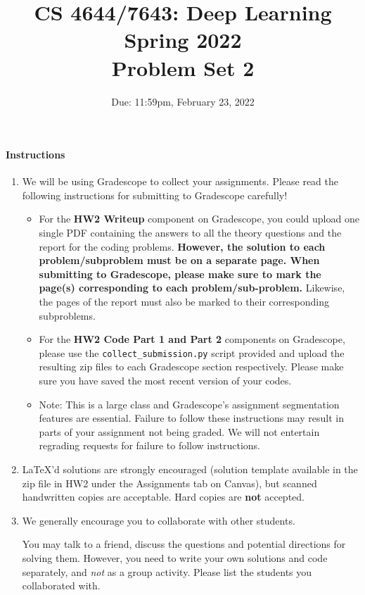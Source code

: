 \documentclass[11pt,english]{article}
\begin{document}
\title{CS 4644/7643: Deep Learning\\
Spring 2022 \\
Problem Set 2}


\date{Due: 11:59pm, February 23, 2022}
\maketitle


\paragraph*{Instructions}
\begin{enumerate}
\item We will be using Gradescope to collect your assignments.  Please read the following instructions for submitting to Gradescope carefully!
     \begin{itemize}
          \item
               For the \textbf{HW2 Writeup} component on Gradescope, you could upload one single PDF containing the answers to all the theory questions and the report for the coding problems. \textbf{However, the solution to each problem/subproblem must be on a separate page. When submitting to Gradescope, please make sure to mark the page(s) corresponding to each problem/sub-problem.} Likewise, the pages of the report must also be marked to their corresponding subproblems.
          \item
               For the \textbf{HW2 Code Part 1 and Part 2} components on Gradescope, 
               please use the \texttt{collect\_submission.py} script provided and upload the resulting zip files to each Gradescope section respectively. Please make sure you have saved the most recent version of your codes.
          \item
               Note: This is a large class and Gradescope's assignment segmentation features are essential.
               Failure to follow these instructions may result in parts of your assignment not being graded.
               We will not entertain regrading requests for failure to follow instructions.
     \end{itemize}

\item
     \LaTeX'd solutions are strongly encouraged (solution template available in the zip file in HW2 under the Assignments tab on Canvas),
     but scanned handwritten copies are acceptable.
     Hard copies are \textbf{not} accepted.


\item We generally encourage you to collaborate with other students.

You may talk to a friend,
discuss the questions and potential directions for solving them. However, you need to write
your own solutions and code separately, and \emph{not} as a group activity.
Please list the students you collaborated with. \\ \\
\end{enumerate}
\newpage
\end{document}
